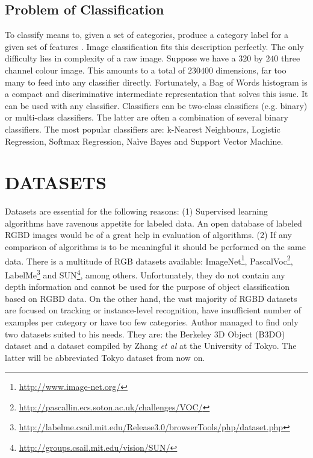 \documentclass[11pt,twoside]{article}
\begin{document}
\subsection{Problem of Classification}

    To classify means to, given a set of categories, produce a category label for a given set of features \cite{ponce2011cv}. Image classification fits this description perfectly. The only difficulty lies in complexity of a raw image. Suppose we have a $320$ by $240$ three channel colour image. This amounts to a total of $230400$ dimensions, far too many to feed into any classifier directly. Fortunately, a Bag of Words histogram is a compact and discriminative intermediate representation that solves this issue. It can be used with any classifier. Classifiers can be two-class classifiers (e.g. binary) or multi-class classifiers. The latter are often a combination of several binary classifiers. The most popular classifiers are: k-Nearest Neighbours, Logistic Regression, Softmax Regression, Na\`ive Bayes and Support Vector Machine.

\section{ DATASETS }

  Datasets are essential for the following reasons: (1) Supervised learning algorithms have ravenous appetite for labeled data. An open database of labeled RGBD images would be of a great help in evaluation of algorithms. (2) If any comparison of algorithms is to be meaningful it should be performed on the same data. There is a multitude of RGB datasets available: ImageNet\footnote{\url{http://www.image-net.org/}}, PascalVoc\footnote{\url{http://pascallin.ecs.soton.ac.uk/challenges/VOC/}}, LabelMe\footnote{\url{http://labelme.csail.mit.edu/Release3.0/browserTools/php/dataset.php}} and SUN\footnote{\url{http://groups.csail.mit.edu/vision/SUN/}}, among others. Unfortunately, they do not contain any depth information and cannot be used for the purpose of object classification based on RGBD data. On the other hand, the vast majority of RGBD datasets are focused on tracking or instance-level recognition, have insufficient number of examples per category or have too few categories. Author managed to find only two datasets suited to his needs. They are: the Berkeley 3D Object (B3DO) dataset \cite{B3DO} and a dataset compiled by Zhang \emph{et al} at the University of Tokyo\cite{zhangcategory}. The latter will be abbreviated Tokyo dataset from now on.
\end{document}
